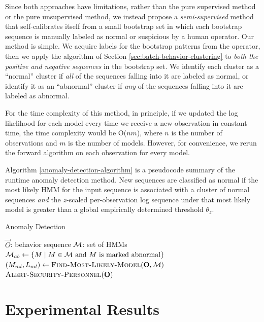 Since both approaches have limitations, rather than the pure
supervised method or the pure unsupervised method, we instead propose
a \textit{semi-supervised} method that self-calibrates itself from a
small bootstrap set in which each bootstrap sequence is manually
labeled as normal or suspicious by a human operator.  Our method is
simple.  We acquire labels for the bootstrap patterns from the
operator, then we apply the algorithm of
Section \ref{sec:batch-behavior-clustering} to
\textit{both the positive and negative sequences} in the bootstrap
set.  We identify each cluster as a ``normal'' cluster if \textit{all}
of the sequences falling into it are labeled as normal, or identify it
as an ``abnormal'' cluster if \textit{any} of the sequences falling
into it are labeled as abnormal.

For the time complexity of this method, in principle, if we updated
the log likelihood for each model every time we receive a new
observation in constant time, the time complexity would be O($nm$),
where $n$ is the number of observations and $m$ is the number of
models. However, for convenience, we rerun the forward
algorithm  on each observation for every
model.

Algorithm \ref{anomaly-detection-algorithm} is a pseudocode summary of
the runtime anomaly detection method. New sequences are classified as
normal if the most likely HMM for the input sequence is associated
with a cluster of normal sequences \textit{and} the $z$-scaled
per-observation log \DIFdelbegin {}\DIFdelend \DIFaddbegin {}\DIFaddend sequence under that most likely
model is greater than a global empirically determined threshold
$\theta_z$.

\begin{algorithm}[t]
  \caption{Anomaly Detection}
  \label{anomaly-detection-algorithm}
  \begin{algorithmic}
    \REQUIRE $\vec{O}$: behavior sequence
    \REQUIRE ${\cal M}$: set of HMMs
    \STATE ${\cal M}_{ab} \gets \{ M \mid M \in {\cal M} \text{~and $M$ is marked abnormal} \}$
    \STATE $( M_{ml}, L_{ml} ) \gets \textsc{Find-Most-Likely-Model}(\vec{O}, {\cal M})$
      \STATE $\textsc{Alert-Security-Personnel}(\vec{O})$
    \ENDIF
  \end{algorithmic}
\end{algorithm}

\section{Experimental Results}
\label{sec:batch-results}


